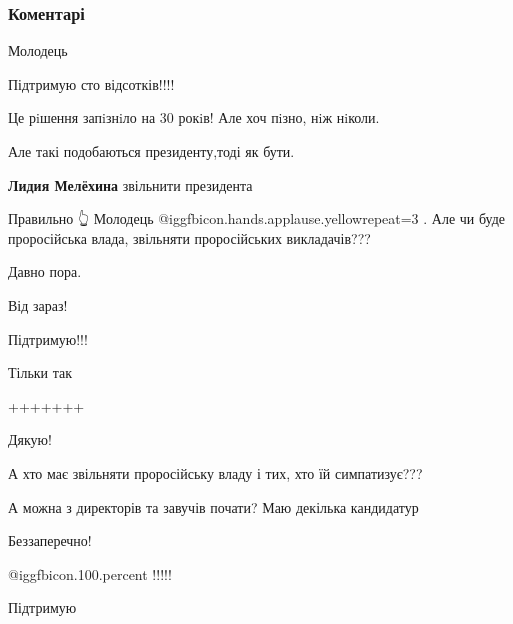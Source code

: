  
 
 
 
 
\subsubsection{Коментарі}

\begin{itemize} %
Молодець

Підтримую сто відсотків!!!!

Це рiшення запiзнiло на 30 рокiв! Але хоч пiзно, нiж нiколи.

Але такі подобаються президенту,тоді як бути.

\begin{itemize} %
\textbf{Лидия Мелёхина} звільнити президента
\end{itemize} %

Правильно 👆 Молодець  @igg{fbicon.hands.applause.yellow}{repeat=3} .
Але чи буде проросійська влада, звільняти проросійських викладачів???


Давно пора.

Від зараз!

Підтримую!!!

Тільки так

+++++++

Дякую!

А хто має звільняти проросійську владу і тих, хто їй симпатизує???

А можна з директорів та завучів почати? Маю декілька кандидатур

Беззаперечно!

 @igg{fbicon.100.percent} !!!!!

Підтримую


\end{itemize}
